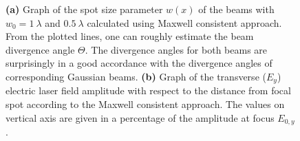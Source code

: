 \begin{figure}[h!]
	\centering
	\hspace{2mm}
	\caption{\textbf{(a)} Graph of the spot size parameter $ w(x) $ of the beams with $ w_0 = 1 \: \lambda $ and $ 0.5 \: \lambda $ calculated using Maxwell consistent approach. From the plotted lines, one can roughly estimate the beam divergence angle $ \Theta $. The divergence angles for both beams are surprisingly in a good accordance with the divergence angles of corresponding Gaussian beams. \textbf{(b)} Graph of the transverse ($ E_{y} $) electric laser field amplitude with respect to the distance from focal spot according to the Maxwell consistent approach. The values on vertical axis are given in a percentage of the amplitude at focus $ E_{0, y} $.}
	\label{fig:7}
\end{figure}

